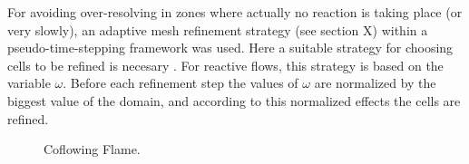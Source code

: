 For avoiding over-resolving in zones where actually no reaction is taking place (or very slowly), an adaptive mesh refinement strategy  (see section X) within a pseudo-time-stepping framework was used.  Here a  suitable strategy for choosing cells to be refined is necesary . For reactive flows, this strategy is based on the variable $\omega$.
Before each refinement step the values of $\omega$ are normalized by the biggest value of the domain, and according to this normalized effects the cells are refined. %


\begin{figure}
	\centering
	\pgfplotsset{width=0.75 \textwidth, compat=1.3}
	\caption{Coflowing Flame.}
\end{figure}
